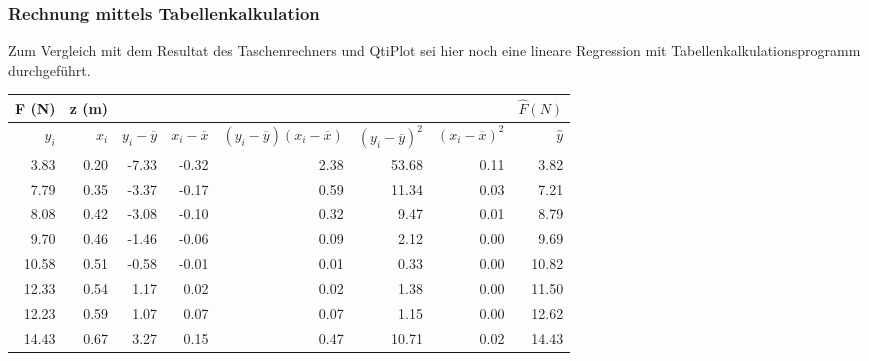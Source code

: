 \subsubsection{Rechnung mittels Tabellenkalkulation}

Zum Vergleich mit  dem Resultat des Taschenrechners und QtiPlot  sei hier noch
eine lineare Regression mit Tabellenkalkulationsprogramm durchgef\"uhrt.

\begin{tabular}{rrrrrrrr}
    \toprule
                F (N)&z (m)&&&&&& $\hat{F}(N)$ \\
    \midrule
             $y_i$      & $x_i$      &  $y_i-\overline{y}$ & $x_i-\overline{x} $ & $(y_i-\overline{y})(x_i-\overline{x})$ & $(y_i-\overline{y})^2$ & $(x_i-\overline{x})^2$ & $ \hat{y}  $ \\
    \midrule
               3.83&        0.20&              -7.33  &              -0.32  &                 2.38                   &        53.68           &         0.11           &  3.82 \\
               7.79&        0.35&              -3.37  &              -0.17  &                 0.59                   &        11.34           &         0.03           &  7.21 \\
               8.08&        0.42&              -3.08  &              -0.10  &                 0.32                   &         9.47           &         0.01           &  8.79 \\
               9.70&        0.46&              -1.46  &              -0.06  &                 0.09                   &         2.12           &         0.00           &  9.69 \\
              10.58&        0.51&              -0.58  &              -0.01  &                 0.01                   &         0.33           &         0.00           &  10.82 \\
              12.33&        0.54&               1.17  &               0.02  &                 0.02                   &         1.38           &         0.00           &  11.50 \\
              12.23&        0.59&               1.07  &               0.07  &                 0.07                   &         1.15           &         0.00           &  12.62 \\
              14.43&        0.67&               3.27  &               0.15  &                 0.47                   &        10.71           &         0.02           &  14.43 \\

\end{tabular}
